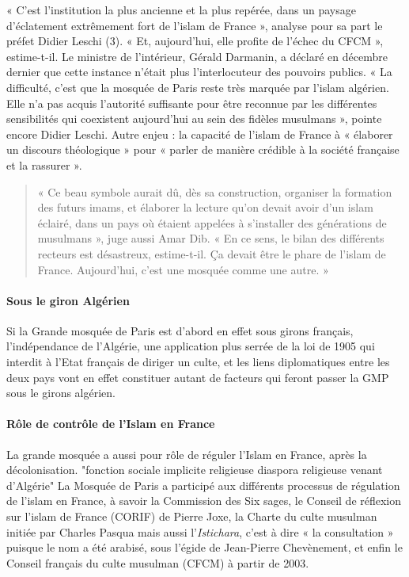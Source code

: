 « C’est l’institution la plus ancienne et la plus repérée, dans un paysage d’éclatement extrêmement fort de l’islam de France », analyse pour sa part le préfet Didier Leschi (3). « Et, aujourd’hui, elle profite de l’échec du CFCM », estime-t-il. Le ministre de l’intérieur, Gérald Darmanin, a déclaré en décembre dernier que cette instance n’était plus l’interlocuteur des pouvoirs publics.
 « La difficulté, c’est que la mosquée de Paris reste très marquée par l’islam algérien. Elle n’a pas acquis l’autorité suffisante pour être reconnue par les différentes sensibilités qui coexistent aujourd’hui au sein des fidèles musulmans », pointe encore Didier Leschi. Autre enjeu : la capacité de l’islam de France à « élaborer un discours théologique » pour « parler de manière crédible à la société française et la rassurer ».

\begin{quote}
    « Ce beau symbole aurait dû, dès sa construction, organiser la formation des futurs imams, et élaborer la lecture qu’on devait avoir d’un islam éclairé, dans un pays où étaient appelées à s’installer des générations de musulmans », juge aussi Amar Dib. « En ce sens, le bilan des différents recteurs est désastreux, estime-t-il. Ça devait être le phare de l’islam de France. Aujourd’hui, c’est une mosquée comme une autre. »
\end{quote}



\paragraph{Sous le giron Algérien}
Si la Grande mosquée de Paris est d'abord en effet sous girons français, l'indépendance de l'Algérie, une application plus serrée de la loi de 1905 qui interdit à l'Etat français de diriger un culte, et les liens diplomatiques entre les deux pays vont en effet constituer autant de facteurs qui feront passer la GMP sous le girons algérien. 
\paragraph{Rôle de contrôle de l'Islam en France} La grande mosquée a aussi pour rôle de réguler l'Islam en France, après la décolonisation. "fonction sociale implicite religieuse diaspora religieuse venant d'Algérie" 
La Mosquée de Paris a participé aux différents
processus de régulation de l’islam en France, à
savoir la Commission des Six sages, le Conseil
de réflexion sur l’islam de France (CORIF) de
Pierre Joxe, la Charte du culte musulman initiée
par Charles Pasqua mais aussi l’\emph{Istichara}, c’est à
dire « la consultation » puisque le nom a été
arabisé, sous l’égide de Jean-Pierre
Chevènement, et enfin le Conseil français du
culte musulman (CFCM) à partir de 2003.
